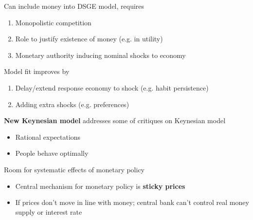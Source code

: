 \documentclass{beamer}
\begin{document}
\begin{frame}
  Can include money into DSGE model, requires
  \begin{enumerate}
    \item Monopolistic competition
    \item Role to justify existence of money (e.g. in utility)
    \item Monetary authority inducing nominal shocks to economy
  \end{enumerate}
  \medskip
  Model fit improves by
  \begin{enumerate}
    \item Delay/extend response economy to shock (e.g. habit persistence)
    \item Adding extra shocks (e.g. preferences)
  \end{enumerate}
\end{frame}


\begin{frame}
  \textbf{New Keynesian model} addresses some of critiques on Keynesian model
  \begin{itemize}
    \item Rational expectations
    \item People behave optimally
  \end{itemize}
  \medskip
  Room for systematic effects of monetary policy  
  \begin{itemize}
    \item Central mechanism for monetary policy is \textbf{sticky prices}
    \item If prices don't move in line with money; central bank can't control real money supply or interest rate
  \end{itemize}
\end{frame}
\end{document}
